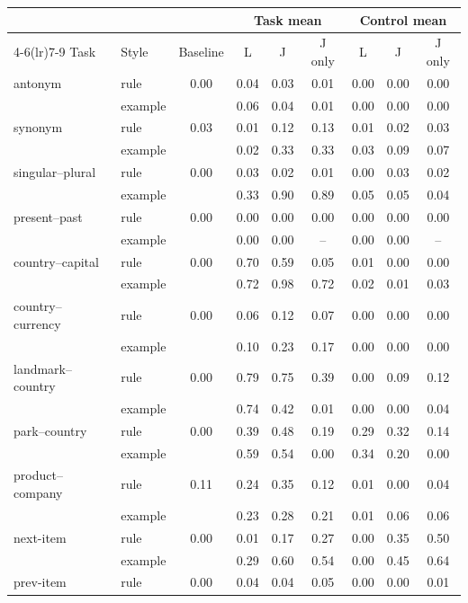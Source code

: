 \begin{tabular}{@{}llccccccc@{}}
\toprule
 & & & \multicolumn{3}{c}{Task mean} & \multicolumn{3}{c}{Control mean} \\
\cmidrule(lr){4-6}\cmidrule(lr){7-9}
Task & Style & Baseline & L & J & J only & L & J & J only \\
\midrule
antonym & rule & 0.00 & 0.04 & 0.03 & 0.01 & 0.00 & 0.00 & 0.00 \\
 & example &  & 0.06 & 0.04 & 0.01 & 0.00 & 0.00 & 0.00 \\
synonym & rule & 0.03 & 0.01 & 0.12 & 0.13 & 0.01 & 0.02 & 0.03 \\
 & example &  & 0.02 & 0.33 & 0.33 & 0.03 & 0.09 & 0.07 \\
singular--plural & rule & 0.00 & 0.03 & 0.02 & 0.01 & 0.00 & 0.03 & 0.02 \\
 & example &  & 0.33 & 0.90 & 0.89 & 0.05 & 0.05 & 0.04 \\
present--past & rule & 0.00 & 0.00 & 0.00 & 0.00 & 0.00 & 0.00 & 0.00 \\
 & example &  & 0.00 & 0.00 & -- & 0.00 & 0.00 & -- \\
country--capital & rule & 0.00 & 0.70 & 0.59 & 0.05 & 0.01 & 0.00 & 0.00 \\
 & example &  & 0.72 & 0.98 & 0.72 & 0.02 & 0.01 & 0.03 \\
country--currency & rule & 0.00 & 0.06 & 0.12 & 0.07 & 0.00 & 0.00 & 0.00 \\
 & example &  & 0.10 & 0.23 & 0.17 & 0.00 & 0.00 & 0.00 \\
landmark--country & rule & 0.00 & 0.79 & 0.75 & 0.39 & 0.00 & 0.09 & 0.12 \\
 & example &  & 0.74 & 0.42 & 0.01 & 0.00 & 0.00 & 0.04 \\
park--country & rule & 0.00 & 0.39 & 0.48 & 0.19 & 0.29 & 0.32 & 0.14 \\
 & example &  & 0.59 & 0.54 & 0.00 & 0.34 & 0.20 & 0.00 \\
product--company & rule & 0.11 & 0.24 & 0.35 & 0.12 & 0.01 & 0.00 & 0.04 \\
 & example &  & 0.23 & 0.28 & 0.21 & 0.01 & 0.06 & 0.06 \\
next-item & rule & 0.00 & 0.01 & 0.17 & 0.27 & 0.00 & 0.35 & 0.50 \\
 & example &  & 0.29 & 0.60 & 0.54 & 0.00 & 0.45 & 0.64 \\
prev-item & rule & 0.00 & 0.04 & 0.04 & 0.05 & 0.00 & 0.00 & 0.01 \\

\end{tabular}
